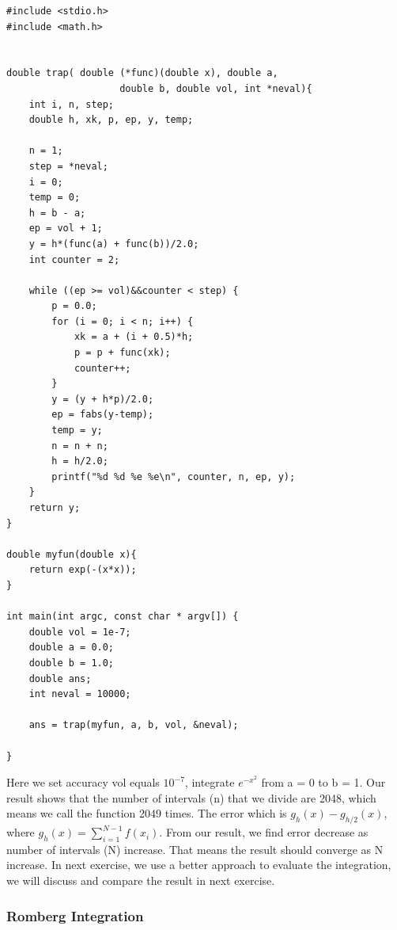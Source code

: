 \documentclass{article}
\begin{document}
\begin{lstlisting}
#include <stdio.h>
#include <math.h>


double trap( double (*func)(double x), double a, 
                    double b, double vol, int *neval){
    int i, n, step;
    double h, xk, p, ep, y, temp;
    
    n = 1;
    step = *neval;
    i = 0;
    temp = 0;
    h = b - a;
    ep = vol + 1;
    y = h*(func(a) + func(b))/2.0;
    int counter = 2;
    
    while ((ep >= vol)&&counter < step) {
        p = 0.0;
        for (i = 0; i < n; i++) {
            xk = a + (i + 0.5)*h;
            p = p + func(xk);
            counter++;
        }
        y = (y + h*p)/2.0;
        ep = fabs(y-temp);
        temp = y;
        n = n + n;
        h = h/2.0;
        printf("%d %d %e %e\n", counter, n, ep, y);
    }
    return y;
}

double myfun(double x){
    return exp(-(x*x));
}

int main(int argc, const char * argv[]) {
    double vol = 1e-7;
    double a = 0.0;
    double b = 1.0;
    double ans;
    int neval = 10000;
    
    ans = trap(myfun, a, b, vol, &neval);

}

\end{lstlisting}
Here we set accuracy vol equals $10^{-7}$, integrate $e^{-x^2}$ from a = 0 to b = 1. Our result shows that the number of intervals (n) that we divide are 2048, which means we call the function 2049 times. The error which is $g_h(x) - g_{h/2}(x)$, where $g_h(x) = \sum_{i=1}^{N-1}f(x_i)$. From our result, we find error decrease as number of intervals (N) increase. That means the result should  converge as N increase. In next exercise, we use a better approach to evaluate the integration, we will discuss and compare the result in next exercise.

\subsubsection{Romberg Integration}
\end{document}
